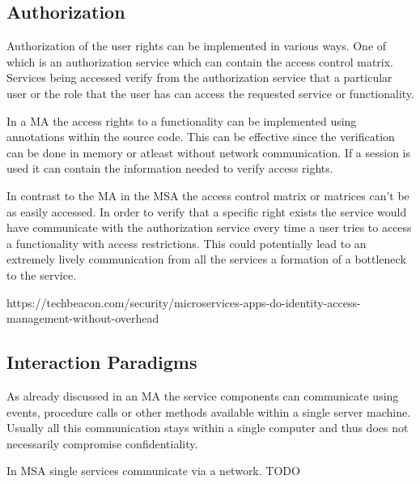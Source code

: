 \begin{sloppypar}
\subsection{Authorization}
\begin{sloppypar}
    Authorization of the user rights can be implemented in various ways. One of 
    which is an authorization service which can contain the access control 
    matrix. Services being accessed verify from the authorization service that
    a particular user or the role that the user has can access the requested 
    service or functionality.
\end{sloppypar}
\begin{sloppypar}
    In a MA the access rights to a functionality can be implemented using
    annotations within the source code. This can be effective since the 
    verification can be done in memory or atleast without network communication. 
    If a session is used it can contain the information needed to verify access 
    rights.
\end{sloppypar}
\begin{sloppypar}
    In contrast to the MA in the MSA the access control matrix or matrices can't 
    be as easily accessed. In order to verify that a specific right exists the 
    service would have communicate with the authorization service every time a user
    tries to access a functionality with access restrictions. This could 
    potentially lead to an extremely lively communication from all the services 
    a formation of a bottleneck to the service.
\end{sloppypar}
\begin{sloppypar}
    https://techbeacon.com/security/microservices-apps-do-identity-access-management-without-overhead
\end{sloppypar}

\subsection{Interaction Paradigms}
\begin{sloppypar}
    As already discussed in an MA the service components can communicate using 
    events, procedure calls or other methods available within a single server 
    machine. Usually all this communication stays within a single computer and 
    thus does not necessarily compromise confidentiality.
\end{sloppypar}
\begin{sloppypar}
    In MSA single services communicate via a network.
    TODO


\end{sloppypar}
\end{sloppypar}
